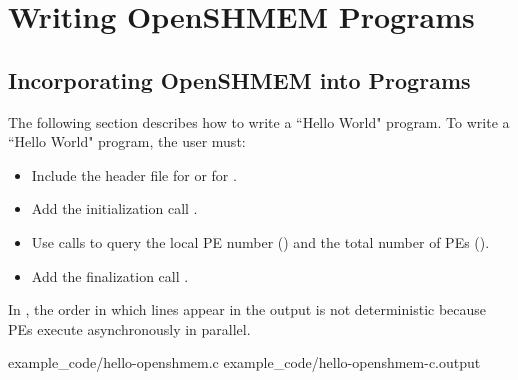 \clearpage %

\appendix

\pagestyle{fancy} \withlinenumbers
\fancyhf{}
\fancyhead[RE, LO]{\leftmark}
\fancyhead[RO, LE]{\thepage}
\fancyfoot[CE, CO]{\thepage}
\renewcommand{\headrulewidth}{0pt}




\chapter{Writing OpenSHMEM Programs}
\section*{Incorporating OpenSHMEM into Programs}\label{sec:writing_programs}

The following section describes how to write a ``Hello World" \openshmem program.
To write a ``Hello World" \openshmem program, the user must:

\begin{itemize}
\item Include the header file  for \Cstd or  for \Fortran.
\item Add the initialization call \hyperref[subsec:shmem_init]{}.
\item Use \openshmem calls to query the local \ac{PE} number
    (\hyperref[subsec:shmem_my_pe]{}) and the total number
    of \acp{PE} (\hyperref[subsec:shmem_n_pes]{}).
\item Add the finalization call \hyperref[subsec:shmem_finalize]{}.
\end{itemize}

In \openshmem, the order in which lines appear in the output is not
deterministic because \acp{PE} execute asynchronously in parallel.

\begin{minipage}{\linewidth}
\vspace{0.1in}
                {example_code/hello-openshmem.c}
                {example_code/hello-openshmem-c.output}
\vspace{0.1in}
\end{minipage}

